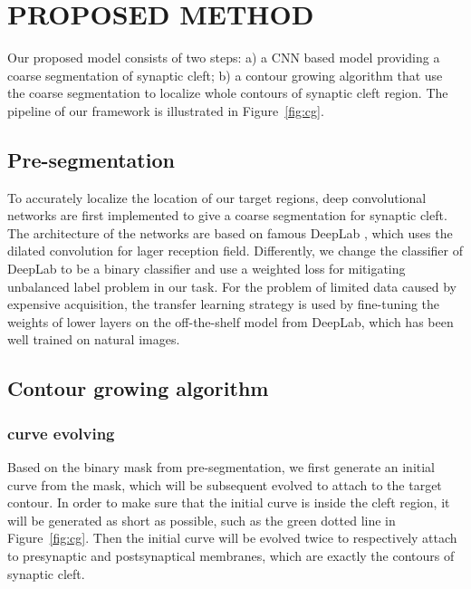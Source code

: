 \section{PROPOSED METHOD}
Our proposed model consists of two steps:
a) a CNN based model providing a coarse segmentation of synaptic cleft;
b) a contour growing algorithm that use the coarse segmentation to localize whole contours of synaptic cleft region.
The pipeline of our framework is illustrated in Figure~\ref{fig:cg}.

\subsection{Pre-segmentation}
To accurately localize the location of our target regions, deep convolutional networks are first implemented to give a coarse segmentation for synaptic cleft.
The architecture of the networks are based on famous DeepLab \cite{Chen2016a}, which uses the dilated convolution for lager reception field.
Differently, we change the classifier of DeepLab to be a binary classifier and use a weighted loss for mitigating unbalanced label problem in our task.
For the problem of limited data caused by expensive acquisition, the transfer learning strategy is used by fine-tuning the weights of lower layers on the off-the-shelf model from DeepLab, which has been well trained on natural images.

\subsection{Contour growing algorithm}
\subsubsection{curve evolving}
\label{sec:curve_evolving}
Based on the binary mask from pre-segmentation, we first generate an initial curve from the mask, which will be subsequent evolved to attach to the target contour.
In order to make sure that the initial curve is inside the cleft region, it will be generated as short as possible, such as the green dotted line in Figure~\ref{fig:cg}.
Then the initial curve will be evolved twice to respectively attach to presynaptic and postsynaptical membranes, which are exactly the contours of synaptic cleft.

